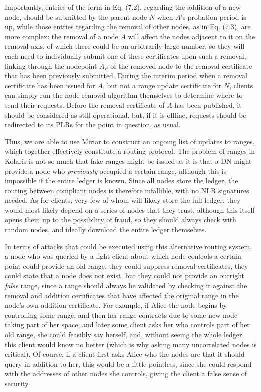 \documentclass{extreport}
\begin{document}
Importantly, entries of the form in Eq. (7.2), regarding the addition of a new node, should be submitted by the parent node \(N\) when \(A\)'s probation period is up, while those entries regarding the removal of other nodes, as in Eq. (7.3), are more complex: the removal of a node \(A\) will affect the nodes adjacent to it on the removal axis, of which there could be an arbitrarily large number, so they will each need to individually submit one of these certificates upon such a removal, linking through the nodepoint \(A_P\) of the removed node to the removal certificate that has been previously submitted. During the interim period when a removal certificate has been issued for \(A\), but not a range update certificate for \(N\), clients can simply run the node removal algorithm themselves to determine where to send their requests. Before the removal certificate of \(A\) has been published, it should be considered as still operational, but, if it is offline, requests should be redirected to its PLRs for the point in question, as usual.

Thus, we are able to use Miriar to construct an ongoing list of updates to ranges, which together effectively constitute a routing protocol. The problem of ranges in Kolaris is not so much that fake ranges might be issued as it is that a DN might provide a node who \emph{previously} occupied a certain range, although this is impossible if the entire ledger is known. Since all nodes store the ledger, the routing between compliant nodes is therefore infallible, with no NLR signatures needed. As for clients, very few of whom will likely store the full ledger, they would most likely depend on a series of nodes that they trust, although this itself opens them up to the possibility of fraud, so they should always check with random nodes, and ideally download the entire ledger themselves.

In terms of attacks that could be executed using this alternative routing system, a node who was queried by a light client about which node controls a certain point could provide an old range, they could suppress removal certificates, they could state that a node does not exist, but they could not provide an outright \emph{false} range, since a range should always be validated by checking it against the removal and addition certificates that have affected the original range in the node's own addition certificate. For example, if Alice the node begins by controlling some range, and then her range contracts due to some new node taking part of her space, and later some client asks her who controls part of her old range, she could feasibly say herself, and, without seeing the whole ledger, this client would know no better (which is why asking many uncorrelated nodes is critical). Of course, if a client first asks Alice who the nodes are that it should query in addition to her, this would be a little pointless, since she could respond with the addresses of other nodes she controls, giving the client a false sense of security.
\end{document}
